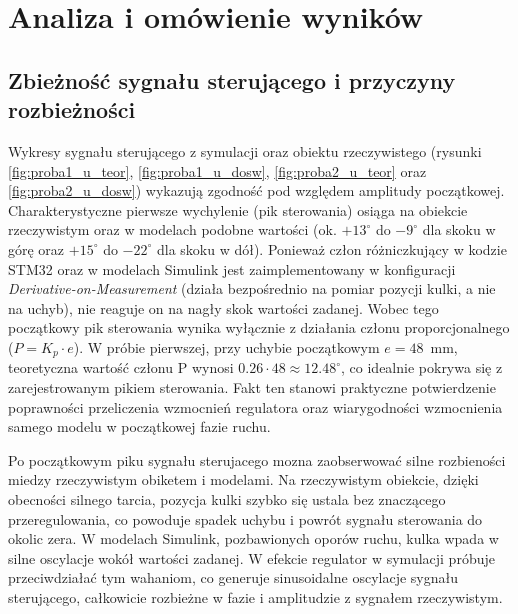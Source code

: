 \section{Analiza i omówienie wyników}
\label{sec:omowienie}

\subsection{Zbieżność sygnału sterującego i przyczyny rozbieżności}
Wykresy sygnału sterującego z symulacji oraz obiektu rzeczywistego (rysunki
\ref{fig:proba1_u_teor}, \ref{fig:proba1_u_dosw}, \ref{fig:proba2_u_teor} oraz
\ref{fig:proba2_u_dosw}) wykazują zgodność pod względem amplitudy początkowej.
Charakterystyczne pierwsze wychylenie (pik sterowania) osiąga na obiekcie
rzeczywistym oraz w modelach podobne wartości (ok. $+13^{\circ}$ do $-9^{\circ}$
dla skoku w górę oraz $+15^{\circ}$ do $-22^{\circ}$ dla skoku w dół). Ponieważ
człon różniczkujący w kodzie STM32 oraz w modelach Simulink jest zaimplementowany
w konfiguracji \textit{Derivative-on-Measurement} (działa bezpośrednio na pomiar
pozycji kulki, a nie na uchyb), nie reaguje on na nagły skok wartości zadanej.
Wobec tego początkowy pik sterowania wynika wyłącznie z działania członu
proporcjonalnego ($P = K_p \cdot e$). W próbie pierwszej, przy uchybie początkowym
$e = 48$~mm, teoretyczna wartość członu P wynosi $0.26 \cdot 48 \approx 12.48^{\circ}$,
co idealnie pokrywa się z zarejestrowanym pikiem sterowania. Fakt ten stanowi
praktyczne potwierdzenie poprawności przeliczenia wzmocnień regulatora oraz
wiarygodności wzmocnienia samego modelu w początkowej fazie ruchu.

Po początkowym piku sygnału sterujacego mozna zaobserwować silne rozbieności miedzy rzeczywistym obiketem i modelami. Na
rzeczywistym obiekcie, dzięki obecności silnego tarcia, pozycja kulki szybko się
ustala bez znaczącego przeregulowania, co powoduje spadek uchybu i powrót sygnału
sterowania do okolic zera. W modelach Simulink, pozbawionych oporów ruchu, kulka
wpada w silne oscylacje wokół wartości zadanej. W efekcie regulator w symulacji próbuje
przeciwdziałać tym wahaniom, co generuje sinusoidalne oscylacje sygnału
sterującego, całkowicie rozbieżne w fazie i amplitudzie z sygnałem rzeczywistym.

